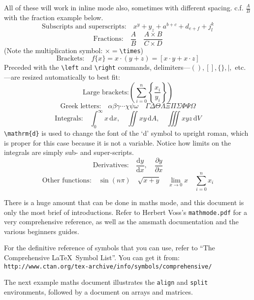 \documentclass[12pt,article,fleqn]{memoir}
\begin{document}
All of these will work in inline mode also, sometimes with different spacing. c.f. $\frac AB$ with the fraction example below.
\[
\text{Subscripts and superscripts:} \quad x^y + y_z + a^{b+c} + d_{e +f} + j^k_l
\]
%
\[
\text{Fractions:} \quad \frac A B \quad \frac{A \times B}{C \times D}
\]
%
(Note the multiplication symbol: $\times = {}$\verb|\times|)
%
\[
\text{Brackets:} \quad f\{x\} = x\cdot(y+z) = [x\cdot y+x\cdot z]
\]
%
Preceded with the \verb|\left| and \verb|\right| commands, delimiters---$(),[],\{\},|,$ etc.---are resized automatically to best fit:
\[
\text{Large brackets:} \left(\sum^n_{i=0} \left\{\frac{x_i}{y_i}\right\}\right)
\]
%
\[
\text{Greek letters:} \quad \alpha \beta \gamma \cdots \chi \psi \omega \quad \Gamma \Delta \Theta \Lambda \Xi \Pi \Sigma \Phi \Psi \Omega
\]
%
\[
\text{Integrals:} \quad \int^\infty_0 x\,\mathrm{d}x , \quad \iint xy\,\mathrm{d}A , \quad \iiint xyz\,\mathrm{d}V
\]
%
\verb|\mathrm{d}| is used to change the font of the `d' symbol to upright roman, which is proper for this case because it is not a variable. Notice how limits on the integrals are simply sub- and super-scripts.
%
\[
\text{Derivatives:} \quad \frac{\mathrm{d}y}{\mathrm{d}x} , \quad \frac{\partial y}{\partial x}
\]
%
\[
\text{Other functions:} \quad \sin(n\pi) \quad \sqrt{x+y} \quad \lim_{x\rightarrow 0} x \quad \sum^n_{i=0} x_i
\]

There is a huge amount that can be done in maths mode, and this document is only the most brief of introductions. Refer to Herbert Voss's \texttt{mathmode.pdf} for a very comprehensive reference, as well as the \textsf{amsmath} documentation and the various beginners guides.

For the definitive reference of symbols that you can use, refer to ``The Comprehensive \LaTeX\ Symbol List''. You can get it from:\\
\verb|http://www.ctan.org/tex-archive/info/symbols/comprehensive/|

The next example maths document illustrates the \texttt{align} and \texttt{split} environments, followed by a document on arrays and matrices.
\end{document}
